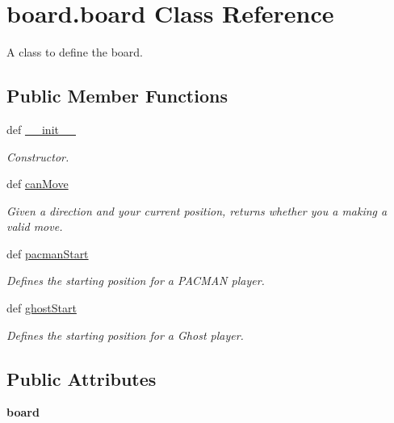 \hypertarget{classboard_1_1board}{
\section{board.board Class Reference}
\label{classboard_1_1board}
}


A class to define the board.  


\subsection*{Public Member Functions}
\begin{DoxyCompactItemize}
\item 
\hypertarget{classboard_1_1board_ac0e543c77c7278f47148c0f35719d5cc}{
def \hyperlink{classboard_1_1board_ac0e543c77c7278f47148c0f35719d5cc}{\_\-\_\-init\_\-\_\-}}
\label{classboard_1_1board_ac0e543c77c7278f47148c0f35719d5cc}

\begin{DoxyCompactList}\small\item\em Constructor. \item\end{DoxyCompactList}\item 
def \hyperlink{classboard_1_1board_a0bcaab198cdcc0187bfa6b29b7541139}{canMove}
\begin{DoxyCompactList}\small\item\em Given a direction and your current position, returns whether you a making a valid move. \item\end{DoxyCompactList}\item 
def \hyperlink{classboard_1_1board_a5b482bb9a90ccfa9f2f25ac4abd068b2}{pacmanStart}
\begin{DoxyCompactList}\small\item\em Defines the starting position for a PACMAN player. \item\end{DoxyCompactList}\item 
def \hyperlink{classboard_1_1board_ad491812ee3e354dc1ecc6ae3a5822f43}{ghostStart}
\begin{DoxyCompactList}\small\item\em Defines the starting position for a Ghost player. \item\end{DoxyCompactList}\end{DoxyCompactItemize}
\subsection*{Public Attributes}
\begin{DoxyCompactItemize}
\item 
\hypertarget{classboard_1_1board_a510051aa32b8f9bee5d27afab823ba3d}{
{\bfseries board}}
\label{classboard_1_1board_a510051aa32b8f9bee5d27afab823ba3d}

\end{DoxyCompactItemize}


